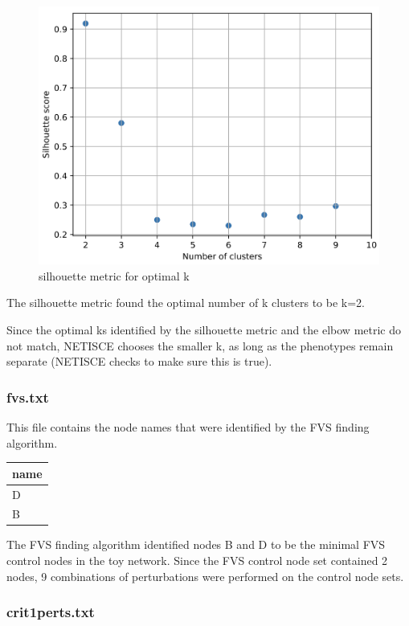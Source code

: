\documentclass[
]{book}
\theoremstyle{definition}
\theoremstyle{definition}
\theoremstyle{definition}
\theoremstyle{definition}
\theoremstyle{remark}
\begin{document}
\begin{figure}

{\centering \includegraphics[width=0.5\linewidth]{images/silhouette} 

}

\caption{silhouette metric for optimal k}\label{fig:unnamed-chunk-11}
\end{figure}

The silhouette metric found the optimal number of k clusters to be k=2.

Since the optimal ks identified by the silhouette metric and the elbow metric do not match, NETISCE chooses the smaller k, as long as the phenotypes remain separate (NETISCE checks to make sure this is true).

\hypertarget{section-id}{%
\subsubsection*{fvs.txt}\label{section-id}}

This file contains the node names that were identified by the FVS finding algorithm.

\begin{tabular}{l}
\hline
name\\
\hline
D\\
\hline
B\\
\hline
\end{tabular}

The FVS finding algorithm identified nodes B and D to be the minimal FVS control nodes in the toy network. Since the FVS control node set contained 2 nodes, 9 combinations of perturbations were performed on the control node sets.

\hypertarget{section-id}{%
\subsubsection*{crit1perts.txt}\label{section-id}}
\end{document}
